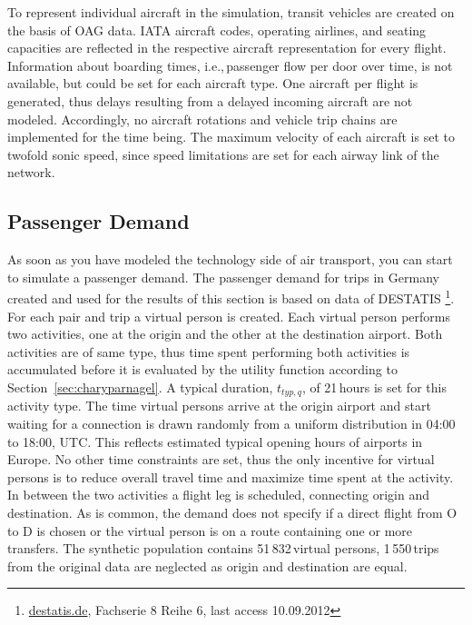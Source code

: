 To represent individual aircraft in the simulation, transit vehicles are created on the basis of OAG data. 
IATA aircraft codes, operating airlines, and seating capacities are reflected in the respective aircraft representation for every flight. 
Information about boarding times, i.e.,\,passenger flow per door over time, is not available, but could be set for each aircraft type. 
One aircraft per flight is generated, thus delays resulting from a delayed incoming aircraft are not modeled.
Accordingly, no aircraft rotations and vehicle trip chains are implemented for the time being. 
The maximum velocity of each aircraft is set to twofold sonic speed, since speed limitations are set for each airway link of the network. 

\subsection{Passenger Demand}
As soon as you have modeled the technology side of air transport, you can start to simulate a passenger demand. 
The passenger demand for trips in Germany created and used for the results of this section is based on  data of DESTATIS 
\footnote{\url{destatis.de}, Fachserie 8 Reihe 6, last access 10.09.2012}.
% 
For each  pair and trip a virtual person is created.
Each virtual person performs two activities, one at the origin and the other at the destination airport. 
Both activities are of same type, thus time spent performing both activities is accumulated before it is evaluated by the utility function according to Section~\ref{sec:charyparnagel}. %
A typical duration, $t_{typ,q}$, of 21\,hours is set for this activity type. 
The time virtual persons arrive at the origin airport and start waiting for a connection is drawn randomly from a uniform distribution in 04:00 to 18:00, UTC. 
This reflects estimated typical opening hours of airports in Europe.
No other time constraints are set, thus the only incentive for virtual persons is to reduce overall travel time and maximize time spent at the activity. 
In between the two activities a flight leg is scheduled, connecting origin and destination.
As is common, the demand does not specify if a direct flight from O to D is chosen or the virtual person is on a route containing one or more transfers.
The synthetic population contains 51\,832\,virtual persons, 1\,550\,trips from the original data are neglected as origin and destination are equal. 
%

